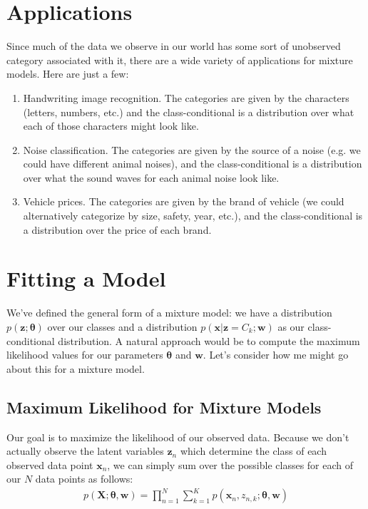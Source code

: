 \section{Applications}
Since much of the data we observe in our world has some sort of unobserved category associated with it, there are a wide variety of applications for mixture models. Here are just a few:
\begin{enumerate}
    \item Handwriting image recognition. The categories are given by the characters (letters, numbers, etc.) and the class-conditional is a distribution over what each of those characters might look like.
    \item Noise classification. The categories are given by the source of a noise (e.g. we could have different animal noises), and the class-conditional is a distribution over what the sound waves for each animal noise look like.
    \item Vehicle prices. The categories are given by the brand of vehicle (we could alternatively categorize by size, safety, year, etc.), and the class-conditional is a distribution over the price of each brand.
\end{enumerate}

\section{Fitting a Model}
We've defined the general form of a mixture model: we have a distribution $p(\textbf{z}; \boldsymbol{\theta})$ over our classes and a distribution $p(\textbf{x}|\textbf{z} = C_k; \textbf{w})$ as our class-conditional distribution. A natural approach would be to compute the maximum likelihood values for our parameters $\boldsymbol{\theta}$ and $\textbf{w}$. Let's consider how me might go about this for a mixture model.

\subsection{Maximum Likelihood for Mixture Models}
Our goal is to maximize the likelihood of our observed data. Because we don't actually observe the latent variables $\textbf{z}_n$ which determine the class of each observed data point $\textbf{x}_n$, we can simply sum over the possible classes for each of our $N$ data points as follows:
\begin{align*}
    p(\textbf{X}; \boldsymbol{\theta}, \textbf{w}) = \prod_{n=1}^{N} \sum_{k=1}^{K} p(\textbf{x}_{n}, z_{n, k}; \boldsymbol{\theta}, \textbf{w})
\end{align*}

